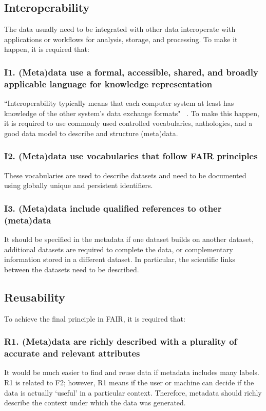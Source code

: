 \subsection*{Interoperability}
The data usually need to be integrated with other data interoperate with applications or workflows for analysis, storage, and processing. To make it happen, it is required that:


\subsubsection*{I1. (Meta)data use a formal, accessible, shared, and broadly applicable language for knowledge representation}

``Interoperability typically means that each computer system at least has knowledge of the other system's data exchange formats" ~\cite{FAIR_Principles}. To make this happen, it is required to use commonly used controlled vocabularies, anthologies, and a good data model to describe and structure (meta)data.
 
\subsubsection*{I2. (Meta)data use vocabularies that follow FAIR principles}
These vocabularies are used to describe datasets and need to be documented using globally unique and persistent identifiers.

\subsubsection*{I3. (Meta)data include qualified references to other (meta)data}
It should be specified in the metadata if one dataset builds on another dataset, additional datasets are required to complete the data, or complementary information stored in a different dataset. In particular, the scientific links between the datasets need to be described.

\subsection*{Reusability}
To achieve the final principle in FAIR, it is required that:

\subsubsection*{R1. (Meta)data are richly described with a plurality of accurate and relevant attributes}
It would be much easier to find and reuse data if metadata includes many labels. R1 is related to F2; however, R1 means if the user or machine can decide if the data is actually `useful' in a particular context. Therefore, metadata should richly describe the context under which the data was generated. 

